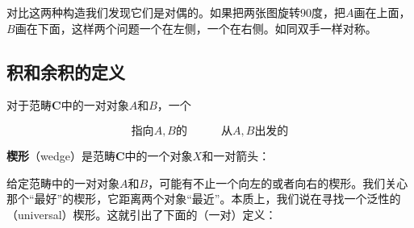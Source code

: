 \documentclass{article}
\begin{document}
对比这两种构造我们发现它们是对偶的。如果把两张图旋转90度，把$A$画在上面，$B$画在下面，这样两个问题一个在左侧，一个在右侧。如同双手一样对称。

\subsection{积和余积的定义}

\begin{definition}
对于范畴$\pmb{C}$中的一对对象$A$和$B$，一个

\[
\text{指向$A, B$的} \quad \quad \quad \text{从$A, B$出发的}
\]

\textbf{楔形}（wedge）是范畴$\pmb{C}$中的一个对象$X$和一对箭头：

\begin{center}
\end{center}
\end{definition}

给定范畴中的一对对象$A$和$B$，可能有不止一个向左的或者向右的楔形。我们关心那个“最好”的楔形，它距离两个对象“最近”。本质上，我们说在寻找一个泛性的（universal）楔形。这就引出了下面的（一对）定义：
\end{document}

